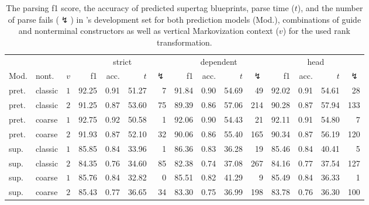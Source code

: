 \documentclass[../../document.tex]{subfiles}
\begin{document}
    \begin{table}
        \caption{\label{tbl:experiments:tiger}
        The parsing f1 score, the accuracy of predicted supertag blueprints, parse time ($t$), and the number of parse fails ($\lightning$) in \tiger{}'s development set for both prediction models (Mod.), combinations of guide and nonterminal constructors as well as vertical Markovization context ($v$) for the used rank transformation.
        }
        \centering
        \setlength{\tabcolsep}{4pt}
        \vspace{.2cm}
        \begin{tabular}{llc|rrrr|rrrr|rrrr}
            \toprule
         &    &        & \multicolumn{4}{c|}{strict} & \multicolumn{4}{c|}{dependent} & \multicolumn{4}{c}{head}  \\
    Mod. & nont.   &\(v\)   & f1 & acc. & $t$ & $\lightning$ & f1 & acc. & $t$ & $\lightning$ & f1 & acc. & $t$ & $\lightning$ \\ \hline
    pret. & classic & \(1\)  & 92.25 & 0.91 & 51.27 & 7 & 91.84 & 0.90 & 54.69 & 49 & 92.02 & 0.91 & 54.61 & 28 \\
    pret. & classic & \(2\)  & 91.25 & 0.87 & 53.60 & 75 & 89.39 & 0.86 & 57.06 & 214 & 90.28 & 0.87 & 57.94 & 133 \\
    pret. & coarse  & \(1\)  & 92.75 & 0.92 & 50.58 & 1 & 92.06 & 0.90 & 54.43 & 21 & 92.11 & 0.91 & 54.80 & 7 \\
    pret. & coarse  & \(2\)  & 91.93 & 0.87 & 52.10 & 32 & 90.06 & 0.86 & 55.40 & 165 & 90.34 & 0.87 & 56.19 & 120 \\
    \midrule
    sup. & classic & \(1\)  & 85.85 & 0.84 & 33.96 & 1 & 86.36 & 0.83 & 36.28 & 19 & 85.46 & 0.84 & 40.41 & 5 \\
    sup. & classic & \(2\)  & 84.35 & 0.76 & 34.60 & 85 & 82.38 & 0.74 & 37.08 & 267 & 84.16 & 0.77 & 37.54 & 127 \\
    sup. & coarse  & \(1\)  & 85.76 & 0.84 & 32.82 & 0 & 85.51 & 0.82 & 41.29 & 9 & 85.49 & 0.84 & 36.33 & 1 \\
    sup. & coarse  & \(2\)  & 85.43 & 0.77 & 36.65 & 34 & 83.30 & 0.75 & 36.99 & 198 & 83.78 & 0.76 & 36.30 & 100 \\
    \bottomrule
        \end{tabular}
    \end{table}
\end{document}
